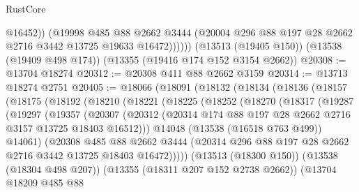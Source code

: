 \begin{lexlean}{RustCore}
\begin{coremodule}
                @16452))
            (@19998
              @485
              @88
              @2662
              @3444
              (@20004 @296 @88 @197 @28 @2662 @2716 @3442 @13725 @19633 @16472))))))
    (@13513 (@19405 @150))
    (@13538 (@19409 @498 @174))
    (@13355 (@19416 @174 @152 @3154 @2662))
@20308 := @13704 @18274
@20312 := @20308 @411 @88 @2662 @3159
@20314 := @13713 @18274 @2751
@20405 := @18066
    (@18091
      (@18132
        (@18134
          (@18136
            (@18157
              (@18175
                (@18192
                  (@18210
                    (@18221
                      (@18225
                        (@18252
                          (@18270
                            (@18317
                              (@19287
                                (@19297
                                  (@19357
                                    (@20307
                                      (@20312
                                        (@20314
                                          @174
                                          @88
                                          @197
                                          @28
                                          @2662
                                          @2716
                                          @3157
                                          @13725
                                          @18403
                                          @16512)))
                                    @14048
                                    (@13538 (@16518 @763 @499))
                                    @14061)
                                  (@20308
                                    @485
                                    @88
                                    @2662
                                    @3444
                                    (@20314
                                      @296
                                      @88
                                      @197
                                      @28
                                      @2662
                                      @2716
                                      @3442
                                      @13725
                                      @18403
                                      @16472)))))
                            (@13513 (@18300 @150))
                            (@13538 (@18304 @498 @207))
                            (@13355 (@18311 @207 @152 @2738 @2662))
                            (@13704
                              @18209
                              @485
                              @88

\end{coremodule}
\end{lexlean}
